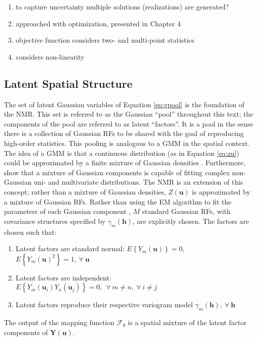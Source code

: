 \begin{enumerate}
    \item to capture uncertainty multiple solutions (realizations) are generated?
    \item approached with optimization, presented in Chapter 4
    \item objective function considers two- and multi-point statistics
    \item considers non-linearity
\end{enumerate}


\FloatBarrier
\subsection{Latent Spatial Structure}
\label{subsec:03latent}

The set of latent Gaussian variables of Equation \ref{eq:gpool} is the foundation of the \gls{NMR}. This set is referred to as the Gaussian ``pool'' throughout this text; the components of the pool are referred to as latent ``factors''. It is a pool in the sense there is a collection of Gaussian \glspl{RF} to be shared with the goal of reproducing high-order statistics. This pooling is analogous to a \gls{GMM} in the spatial context. The idea of a \gls{GMM} is that a continuous distribution (as in Equation \ref{eq:zu}) could be approximated by a finite mixture of Gaussian densities \citep{mclachlan2019finite}. Furthermore, \cite{silva2018multivariate} show that a mixture of Gaussian components is capable of fitting complex non-Gaussian uni- and multivariate distributions. The \gls{NMR} is an extension of this concept; rather than a mixture of Gaussian densities, $Z(\mathbf{u})$ is approximated by a mixture of Gaussian \glspl{RF}. Rather than using the \gls{EM} algorithm to fit the parameters of each Gaussian component \citep{mclachlan2019finite}, $M$ standard Gaussian \glspl{RF}, with covariance structures specified by $\gamma_{m}(\mathbf{h})$, are explicitly chosen. The factors are chosen such that:
\begin{enumerate}[noitemsep]
    \item Latent factors are standard normal: $E\left\{Y_{m}(\mathbf{u})\right\}=0$, \ $E\left\{Y_{m}(\mathbf{u})^{2}\right\}=1, \ \forall \ \mathbf{u}$
    \item Latent factors are independent: $E\left\{Y_{m}(\mathbf{u}_{i})Y_{n}(\mathbf{u}_{j})\right\}=0, \ \ \forall \ m\neq n, \ \forall \ i \neq j$
    \item Latent factors reproduce their respective variogram model $\gamma_m(\mathbf{h}), \ \forall \ \mathbf{h}$
\end{enumerate}
The output of the mapping function $\mathcal{F}_{\theta}$ is a spatial mixture of the latent factor components of $\mathbf{Y}(\mathbf{u})$.

